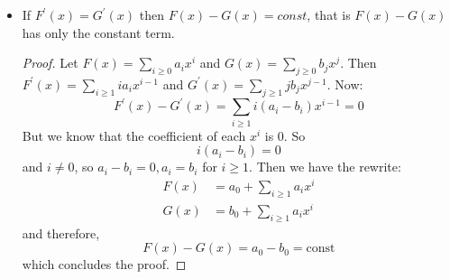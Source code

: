 \documentclass{article}
\begin{document}
\begin{itemize}
        \item If $F^{\prime}(x) = G^{\prime}(x)$ then $F(x) - G(x) = const$, that is $F(x) - G(x)$ has only the constant term.
            \begin{proof}
                Let $F(x) = \sum_{i \geq 0} a_{i}x^{i}$ and $G(x) = \sum_{j \geq 0}b_{j}x^{j}$. Then $F^{\prime}(x) = \sum_{i \geq 1}ia_{i}x^{i - 1}$ and $G^{\prime}(x) = \sum_{j \geq 1}jb_{j}x^{j - 1}$. Now:
                    \begin{equation*}
                        F^{\prime}(x) - G^{\prime}(x) = \sum_{i \geq 1}i(a_{i} - b_{i})x^{i - 1} = 0
                    \end{equation*}
                But we know that the coefficient of each $x^{i}$ is $0$. So
                    \begin{equation*}
                        i(a_{i} - b_{i}) = 0
                    \end{equation*}
                and $i \neq 0$, so $a_{i} - b_{i} = 0, a_{i} = b_{i}$ for $i \geq 1$. Then we have the rewrite:
                    \begin{align*}
                        F(x) &= a_{0} + \sum_{i \geq 1}a_{i}x^{i}  \\
                        G(x) &= b_{0} + \sum_{i \geq 1}a_{i}x^{i}  
                    \end{align*}
                and therefore,
                    \begin{equation*}
                        F(x) - G(x) = a_{0} - b_{0} = \text{const}
                    \end{equation*}
                which concludes the proof.
            \end{proof}
    \end{itemize}
\end{document}

